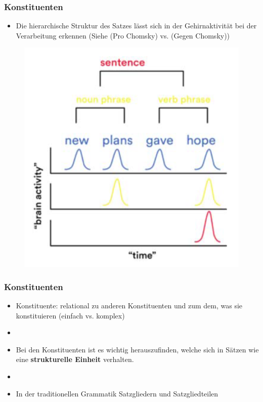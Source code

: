 \begin{frame}
\frametitle{Konstituenten}

\begin{itemize}
	\item Die hierarchische Struktur des Satzes lässt sich in der Gehirnaktivität bei der Verarbeitung erkennen (Siehe \citet{Devitt15a} (Pro Chomsky) vs. \citet{Boutonnet15a} (Gegen Chomsky))	
\end{itemize}

\begin{figure}
\centering
	\includegraphics[scale=.35]{material/10gehirnaktivitaet}
	\caption{\citep[Quelle:][]{Boutonnet15a}}
\end{figure}

\end{frame}


\begin{frame}
\frametitle{Konstituenten}

\begin{itemize}
	\item Konstituente: relational zu anderen Konstituenten und zum dem, was sie konstituieren (\ras einfach vs. komplex)
	\item[]
	\item Bei den Konstituenten ist es wichtig herauszufinden, welche sich in Sätzen wie eine \textbf{strukturelle Einheit} verhalten.
	\item[]
	\item In der traditionellen Grammatik \ras Satzgliedern und Satzgliedteilen

\end{itemize}

\end{frame}


